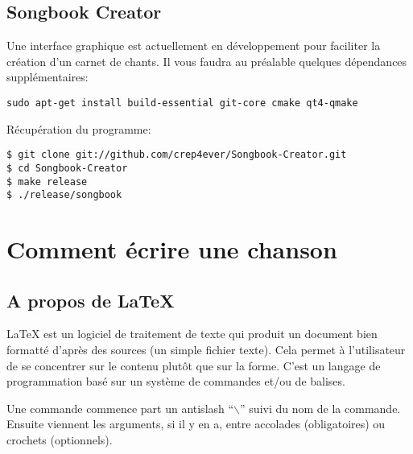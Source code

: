 \documentclass[a4paper,twoside]{article}
\begin{document}
\subsection{Songbook Creator}

Une interface graphique est actuellement en développement pour
faciliter la création d'un carnet de chants. Il vous faudra au
préalable quelques dépendances supplémentaires:

\begin{verbatim}
sudo apt-get install build-essential git-core cmake qt4-qmake
\end{verbatim}

Récupération du programme:

\begin{verbatim}
$ git clone git://github.com/crep4ever/Songbook-Creator.git
$ cd Songbook-Creator
$ make release
$ ./release/songbook
\end{verbatim}

\section{Comment écrire une chanson}

\subsection{A propos de LaTeX}

LaTeX est un logiciel de traitement de texte qui produit un document
bien formatté d'après des sources (un simple fichier texte). Cela
permet à l'utilisateur de se concentrer sur le contenu plutôt que sur
la forme. C'est un langage de programmation basé sur un système de
commandes et/ou de balises.

Une commande commence part un antislash ``$\backslash$'' suivi du nom
de la commande. Ensuite viennent les arguments, si il y en a, entre
accolades (obligatoires) ou crochets (optionnels).

\end{document}
